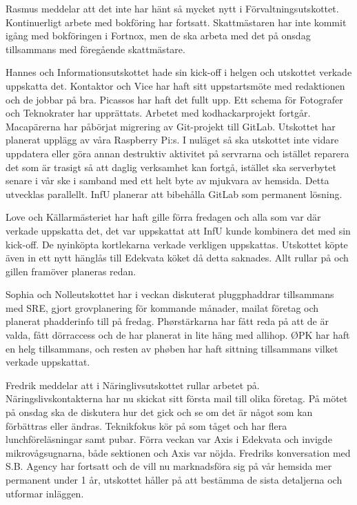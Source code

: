 \documentclass[10pt]{article}
\begin{document}
\begin{paragrafer}
\begin{paragrafer}
Rasmus meddelar att det inte har hänt så mycket nytt i Förvaltningsutskottet. 
Kontinuerligt arbete med bokföring har fortsatt. 
Skattmästaren har inte kommit igång med bokföringen i Fortnox, men de ska arbeta med det på onsdag tillsammans med föregående skattmästare. 

Hannes och Informationsutskottet hade sin kick-off i helgen och utskottet verkade uppskatta det.
Kontaktor och Vice har haft sitt uppstartsmöte med redaktionen och de jobbar på bra.
Picassos har haft det fullt upp.
Ett schema för Fotografer och Teknokrater har upprättats.
Arbetet med kodhackarprojekt fortgår.
Macapärerna har påbörjat migrering av Git-projekt till GitLab.
Utskottet har planerat upplägg av våra Raspberry Pi:s.
I nuläget så ska utskottet inte vidare uppdatera eller göra annan destruktiv aktivitet på servrarna och istället reparera det som är trasigt så att daglig verksamhet kan fortgå, istället ska serverbytet senare i vår ske i samband med ett helt byte av mjukvara av hemsida. Detta utvecklas parallellt. InfU planerar att bibehålla GitLab som permanent lösning.

Love och Källarmästeriet har haft gille förra fredagen och alla som var där verkade uppskatta det, det var uppskattat att InfU kunde kombinera det med sin kick-off. 
De nyinköpta kortlekarna verkade verkligen uppskattas. 
Utskottet köpte även in ett nytt hänglås till Edekvata köket då detta saknades. 
Allt rullar på och gillen framöver planeras redan.

Sophia och Nolleutskottet har i veckan diskuterat pluggphaddrar tillsammans med SRE, gjort grovplanering för kommande månader, mailat företag och planerat phadderinfo till på fredag. 
Phørstärkarna har fått reda på att de är valda, fått dörraccess och de har planerat in lite häng med allihop. 
ØPK har haft en helg tillsammans, och resten av phøben har haft sittning tillsammans vilket verkade uppskattat.

Fredrik meddelar att i Näringlivsutskottet rullar arbetet på. 
Näringslivskontakterna har nu skickat sitt första mail till olika företag. 
På mötet på onsdag ska de diskutera hur det gick och se om det är något som kan förbättras eller ändras. 
Teknikfokus kör på som tåget och har flera lunchföreläsningar samt pubar. 
Förra veckan var Axis i Edekvata och invigde mikrovågsugnarna, både sektionen och Axis var nöjda. 
Fredriks konversation med S.B. Agency har fortsatt och de vill nu marknadsföra sig på vår hemsida mer permanent under 1 år, utskottet håller på att bestämma de sista detaljerna och utformar inläggen. 


\end{paragrafer}
\end{paragrafer}
\end{document}
